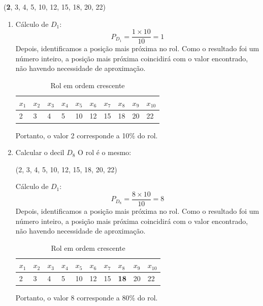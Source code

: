     \begin{center}
        (\textbf{2}, 3, 4, 5, 10, 12, 15, 18, 20, 22)
    \end{center}
\begin{enumerate}[label=\alph*.]
    \item     Cálculo de \(D_1\):
    \[
     P_{D_1}=\frac{1\times 10}{10}=1  
    \]
    Depois, identificamos a posição mais próxima no rol. Como o resultado foi um número inteiro, a posição mais próxima coincidirá com o valor encontrado, não havendo necessidade de aproximação.
    \begin{table}[H]
        \centering
        \begin{tabular}{llllllllll}
            \toprule
            $x_1$&$x_2$&$x_3$&$x_4$&$x_5$&$x_6$&$x_7$&$x_8$&$x_9$&$x_{10}$\\
            \midrule
            2& 3& 4& 5& 10& 12& 15& 18& 20& 22\\
            \bottomrule
            \end{tabular}
            \caption{Rol em ordem crescente}
    \end{table}

    Portanto, o valor 2 corresponde a 10\% do rol.

    \item Calcular o decil \(D_8\)
O rol é o mesmo:
\begin{center}
    (2, 3, 4, 5, 10, 12, 15, 18, 20, 22)
\end{center}
    
Cálculo de \(D_1\):
    \[
     P_{D_8}=\frac{8\times 10}{10}=8 
    \]
    Depois, identificamos a posição mais próxima no rol. Como o resultado foi um número inteiro, a posição mais próxima coincidirá com o valor encontrado, não havendo necessidade de aproximação.
    \begin{table}[H]
        \centering
        \begin{tabular}{llllllllll}
            \toprule
            $x_1$&$x_2$&$x_3$&$x_4$&$x_5$&$x_6$&$x_7$&$x_8$&$x_9$&$x_{10}$\\
            \midrule
            2& 3& 4& 5& 10& 12& 15& \textbf{18}& 20& 22\\
            \bottomrule
            \end{tabular}
            \caption{Rol em ordem crescente}
    \end{table}

    Portanto, o valor 8 corresponde a 80\% do rol.
\end{enumerate}

